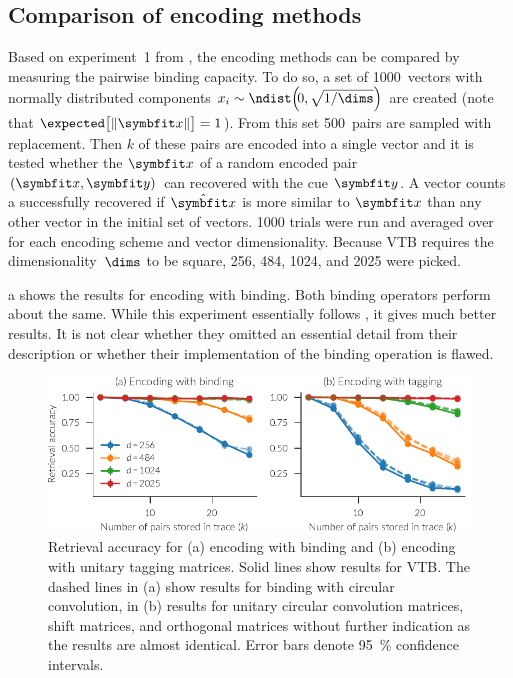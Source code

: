 \subsection{Comparison of encoding methods}
Based on experiment~1 from \textcite{recchia2015}, the encoding methods can be compared by measuring the pairwise binding capacity.
To do so, a set of \num{1000}~vectors with normally distributed components $x_i \sim \ndist\!\del{\!0, \sqrt{1/\dims}}$ are created (note that $\expected\!\sbr{\,\norm{\vc x}} = 1$).
From this set \num{500}~pairs are sampled with replacement.
Then $k$ of these pairs are encoded into a single vector and it is tested whether the $\vc x$ of a random encoded pair $(\vc x, \vc y)$ can recovered with the cue $\vc y$.
A vector counts a successfully recovered if $\hat{\vc x}$ is more similar to $\vc x$ than any other vector in the initial set of vectors.
\num{1000} trials were run and averaged over for each encoding scheme and vector dimensionality.
Because VTB requires the dimensionality~$\dims$ to be square, \num{256}, \num{484}, \num{1024}, and \num{2025} were picked.

a shows the results for encoding with binding.
Both binding operators perform about the same.
While this experiment essentially follows \textcite{recchia2015}, it gives much better results.
It is not clear whether they omitted an essential detail from their description or whether their implementation of the binding operation is flawed.
\begin{figure}
    \centering
    \includegraphics{figures/encoding}
    \caption[Retrieval accuracy of encoding methods]{Retrieval accuracy for (a) encoding with binding and (b) encoding with unitary tagging matrices. Solid lines show results for VTB\@. The dashed lines in (a) show results for binding with circular convolution, in (b) results for unitary circular convolution matrices, shift matrices, and orthogonal matrices without further indication as the results are almost identical. Error bars denote \SI{95}{\percent} confidence intervals.}\label{fig:encoding}
\end{figure}


